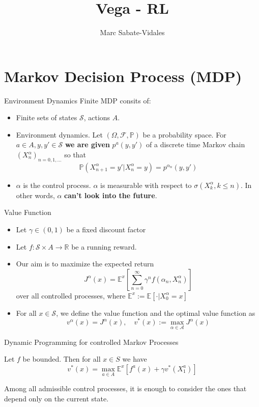 \documentclass{beamer}
\title[RL]{Vega - RL}
\subtitle{}
\author{Marc Sabate-Vidales}
\institute{The University of Edinburgh}
\begin{document}
\begin{frame}
\titlepage
\end{frame}


\section{Markov Decision Process (MDP)}
\begin{frame}{Environment Dynamics}
Finite MDP consits of:
\begin{itemize}
\item Finite sets of states $\mathcal S$, actions $A$. %
\item Environment dynamics. Let $(\Omega, \mathcal F, \mathbb P)$ be a probability space. For $a\in A, y,y'\in \mathcal S$ \textbf{we are given} $p^a(y,y')$ of a discrete time Markov chain $(X_n^\alpha )_{n=0,1,\ldots}$ so that 
\[
\mathbb P(X^\alpha_{n+1} = y' | X_n^\alpha = y) = p^{\alpha_n}(y,y')
\]	
\item $\alpha$ is the control process. $\alpha$ is measurable with respect to $\sigma(X^\alpha_k, k\leq n)$. In other words, $\alpha$ \textbf{can't look into the future}. 
\end{itemize}

\end{frame}

\begin{frame}{Value Function}
\begin{itemize}
	\item Let $\gamma \in(0,1)$ be a fixed discount factor
	\item Let $f: \mathcal S \times A \rightarrow \mathbb R$ be a running reward.%
	\item Our aim is to maximize the expected return
	\[
	J^\alpha(x) = \mathbb E^x \left [ \sum_{n=0}^\infty \gamma^n f(\alpha_n, X_n^\alpha)\right]
	\]
	over all controlled processes, where $\mathbb E^x := \mathbb E[\cdot |X_0^\alpha = x]$ 
	\item For all $x\in \mathcal S$, we define the value function and the optimal value function as
	\[
	v^\alpha(x) = J^\alpha(x), \quad v^*(x) := \max_{\alpha \in \mathcal A} J^\alpha(x) 
	\]
\end{itemize}
\end{frame}

\begin{frame}{Dynamic Programming for controlled Markov Processes}

\begin{Theorem}[DPP]\label{thm:dpp}
	Let $f$ be bounded. Then for all $x\in S$ we have 
	\[
	v^*(x) = \max_{a\in A} \mathbb E^x \left[f^a(x) + \gamma v^*(X_1^a) \right]
	\]
\end{Theorem}
\begin{Corollary}
	Among all admissible control processes, it is enough to consider the ones that depend only on the current state.
\end{Corollary}
\end{frame}
\end{document}
